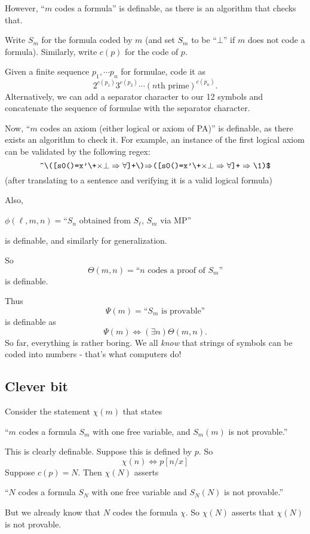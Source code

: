 \documentclass[a4paper]{article}
\begin{document}
However, ``$m$ codes a formula'' is definable, as there is an algorithm that checks that.

Write $S_m$ for the formula coded by $m$ (and set $S_m$ to be ``$\bot$'' if $m$ does not code a formula). Similarly, write $c(p)$ for the code of $p$.

Given a finite sequence $p_1, \cdots p_n$ for formulae, code it as
\[
  2^{c(p_1)}3^{c(p_2)}\cdots (n\text{th prime})^{c(p_n)}.
\]
Alternatively, we can add a separator character to our 12 symbols and concatenate the sequence of formulae with the separator character.

Now, ``$m$ codes an axiom (either logical or axiom of PA)'' is definable, as there exists an algorithm to check it.  For example, an instance of the first logical axiom can be validated by the following regex:
\[
  \verb/^\([s0()=x'\+/\mathtt{\times\bot\Rightarrow\forall}\verb/]+\)/\mathtt{\Rightarrow}\verb/([s0()=x'\+/\mathtt{\times\bot\Rightarrow\forall}\verb/]+/\Rightarrow\verb/\1)$/
\]
(after translating to a sentence and verifying it is a valid logical formula)

Also,
\begin{center}
  $\phi(\ell, m, n) = $``$S_n$ obtained from $S_\ell$, $S_m$ via MP''
\end{center}
is definable, and similarly for generalization.

So
\[
  \Theta(m, n) =\text{``}n\text{ codes a proof of }S_m\text{''}
\]
is definable.

Thus
\[
  \Psi(m) = \text{``}S_m\text{ is provable''}
\]
is definable as
\[
  \Psi(m) \Leftrightarrow (\exists n)\Theta(m, n).
\]
So far, everything is rather boring. We all \emph{know} that strings of symbols can be coded into numbers - that's what computers do!

\subsection*{Clever bit}
Consider the statement $\chi(m)$ that states
\begin{center}
  ``$m$ codes a formula $S_m$ with one free variable, and $S_m(m)$ is not provable.''
\end{center}
This is clearly definable. Suppose this is defined by $p$. So
\[
  \chi(n) \Leftrightarrow p[n/x]
\]
Suppose $c(p) = N$. Then $\chi(N)$ asserts
\begin{center}
  ``$N$ codes a formula $S_N$ with one free variable and $S_N(N)$ is not provable.''
\end{center}
But we already know that $N$ codes the formula $\chi$. So $\chi(N)$ asserts that $\chi(N)$ is not provable.
\end{document}

